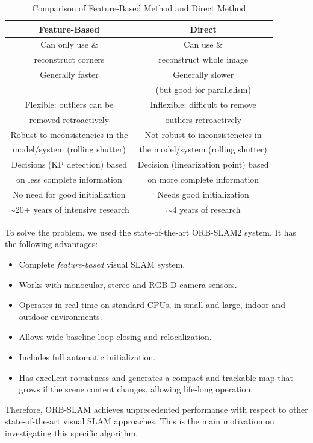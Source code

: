\documentclass[letterpaper, 10 pt, conference]{IEEEtran}
\begin{document}
\begin{table}[htbp]
\caption{Comparison of Feature-Based Method and Direct Method \cite{c2}}
\begin{center}
\begin{tabular}{|c|c|}
\hline
\textbf{Feature-Based} & \textbf{Direct}\\
\hline\hline 
\color{red}Can only use \& 
& \color{ForestGreen}Can use \& \\
\color{red}reconstruct corners 
& \color{ForestGreen}reconstruct whole image \\
\hline
\color{ForestGreen}Generally faster 
& \color{red}Generally slower \\

& \color{red}(but good for parallelism) \\
\hline
\color{ForestGreen}Flexible: outliers can be 
& \color{red}Inflexible: difficult to remove \\
\color{ForestGreen}removed retroactively 
& \color{red}outliers retroactively \\
\hline
\color{ForestGreen}Robust to inconsistencies in the
& \color{YellowOrange}Not robust to inconsistencies in \\
\color{ForestGreen}model/system (rolling shutter) 
& \color{YellowOrange}the model/system (rolling shutter) \\
\hline
\color{red}Decisions (KP detection) based 
& \color{ForestGreen}Decision (linearization point) based \\
\color{red}on less complete information 
& \color{ForestGreen}on more complete information \\
\hline
\color{ForestGreen}No need for good initialization 
& \color{YellowOrange}Needs good initialization \\
\hline
$\sim$20+ years of intensive research 
& $\sim$4 years of research \\
\hline
\end{tabular}
\label{tab:1}
\end{center}
\end{table}

To solve the problem, we used the state-of-the-art ORB-SLAM2 system. It has the
following advantages: 
\begin{itemize}
    \item Complete \textit{feature-based} visual SLAM system.
    \item Works with monocular, stereo and RGB-D camera sensors.
    \item Operates in real time on standard CPUs, in small and large, indoor
    and outdoor environments. 
    \item Allows wide baseline loop closing and relocalization.
    \item Includes full automatic initialization.
    \item Has excellent robustness and generates a compact and trackable map 
    that grows if the scene content changes, allowing life-long operation.
\end{itemize}
Therefore, ORB-SLAM achieves unprecedented performance with respect to other 
state-of-the-art visual SLAM approaches. This is the main motivation on 
investigating this specific algorithm. 
\end{document}
